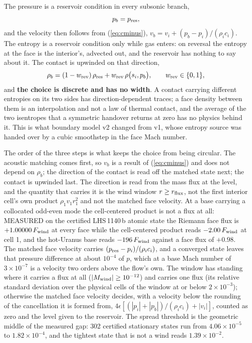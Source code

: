 \documentclass[english,a4paper]{my_memo}
\begin{document}
The pressure is a reservoir condition in every subsonic branch,
\begin{equation}
p_b = p_{\rm res} ,
\end{equation}
and the velocity then follows from (\ref{eq:cminus}),
$v_b = v_i + (p_b - p_i)/(\rho_i c_i)$. The entropy is a reservoir
condition only while gas enters: on reversal the entropy at the face is the
interior's, advected out, and the reservoir has nothing to say about it. The
contact is upwinded on that direction,
\begin{equation}
\rho_b = (1 - w_{\rm rev})\,\rho_{\rm res}
       + w_{\rm rev}\,\rho\big(s_i, p_b\big),
\qquad w_{\rm rev}\in\{0,1\},
\end{equation}
and \textbf{the choice is discrete and has no width}. A contact carrying
different entropies on its two sides has direction-dependent traces; a face
density between them is an interpolation and not a law of thermal contact,
and the average of the two isentropes that a symmetric handover returns at
zero has no physics behind it. This is what boundary model v2 changed from
v1, whose entropy source was handed over by a cubic smoothstep in the face
Mach number.

The order of the three steps is what keeps the choice from being circular.
The acoustic matching comes first, so $v_b$ is a result of
(\ref{eq:cminus}) and does not depend on $\rho_b$; the direction of the
contact is read off the matched state next; the contact is upwinded last.
The direction is read from the mass flux at the level, and the quantity that
carries it is the wind window $r\ge r_{\rm flux}$, not the first interior
cell's own product $\rho_1v_1r_1^2$ and not the matched face velocity. At a
base carrying a collocated odd-even mode the cell-centered product is not a
flux at all: MEASURED on the certified LHS\,1140\,b atomic state the Riemann
face flux is $+1.00000\,F_{\rm wind}$ at every face while the cell-centered
product reads $-2.00\,F_{\rm wind}$ at cell 1, and the hot-Uranus base reads
$-196\,F_{\rm wind}$ against a face flux of $+0.98$. The matched face
velocity carries $(p_{\rm res}-p_i)/(\rho_ic_i)$, and a converged state
leaves that pressure difference at about $10^{-4}$ of $p$, which at a base
Mach number of $3\times10^{-7}$ is a velocity two orders above the flow's
own. The window has standing where it carries a flux at all
($|M_{\rm wind}|\ge10^{-12}$) and carries one flux (its relative standard
deviation over the physical cells of the window at or below
$2\times10^{-3}$); otherwise the matched face velocity decides, with a
velocity below the rounding of the cancellation it is formed from,
$4\epsilon[(|p_i|+|p_b|)/(\rho_ic_i)+|v_i|]$, counted as zero and the level
given to the reservoir. The spread threshold is the geometric middle of the
measured gap: 302 certified stationary states run from $4.06\times10^{-5}$ to
$1.82\times10^{-4}$, and the tightest state that is not a wind reads
$1.39\times10^{-2}$.
\end{document}
